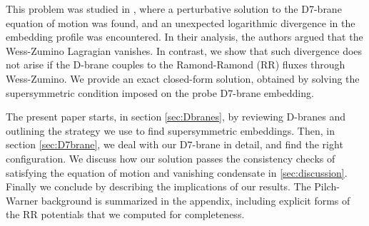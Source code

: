 This problem was studied in \cite{Albash:2011nw}, where a perturbative solution to the D7-brane equation of motion was found, and an unexpected logarithmic divergence in the embedding profile was encountered. In their analysis, the authors argued that the Wess-Zumino Lagragian vanishes. In contrast, we show that such divergence does not arise if the D-brane couples to the Ramond-Ramond (RR) fluxes through Wess-Zumino. We provide an exact closed-form solution, obtained
by solving the supersymmetric condition imposed on the probe D7-brane embedding.


The present paper starts, in section \ref{sec:Dbranes}, by reviewing D-branes and outlining the strategy we use to find supersymmetric embeddings. Then, in section \ref{sec:D7brane}, we deal with our D7-brane in detail, and find the right configuration. We discuss how our solution passes the consistency checks of satisfying the equation of motion and vanishing condensate in \ref{sec:discussion}. Finally we conclude by describing the implications of our results. The Pilch-Warner background is summarized in the appendix, including explicit forms of the RR potentials that we computed for completeness. 

